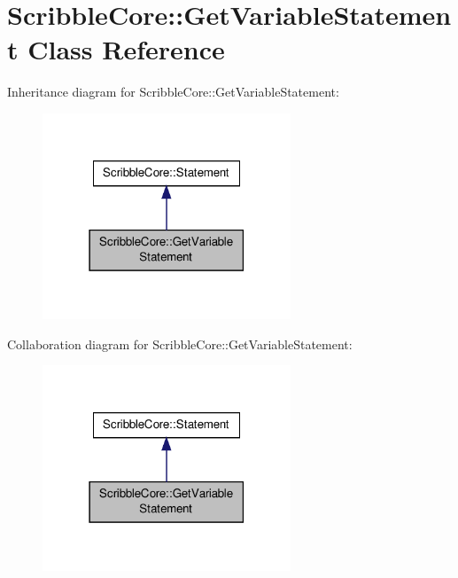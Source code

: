\hypertarget{class_scribble_core_1_1_get_variable_statement}{\section{Scribble\-Core\-:\-:Get\-Variable\-Statement Class Reference}
\label{class_scribble_core_1_1_get_variable_statement}
}


Inheritance diagram for Scribble\-Core\-:\-:Get\-Variable\-Statement\-:
\nopagebreak
\begin{figure}[H]
\begin{center}
\leavevmode
\includegraphics[width=210pt]{class_scribble_core_1_1_get_variable_statement__inherit__graph}
\end{center}
\end{figure}


Collaboration diagram for Scribble\-Core\-:\-:Get\-Variable\-Statement\-:
\nopagebreak
\begin{figure}[H]
\begin{center}
\leavevmode
\includegraphics[width=210pt]{class_scribble_core_1_1_get_variable_statement__coll__graph}
\end{center}
\end{figure}
